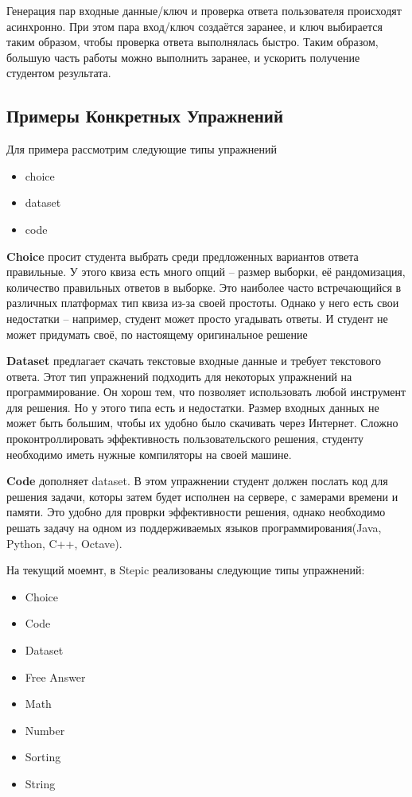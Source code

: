 \documentclass{matmex-diploma-custom}
\begin{document}
Генерация пар входные данные/ключ и проверка ответа пользователя
происходят асинхронно. При этом пара вход/ключ создаётся заранее, и
ключ выбирается таким образом, чтобы проверка ответа выполнялась
быстро. Таким образом, большую часть работы можно выполнить заранее,
и ускорить получение студентом результата.

\subsection*{Примеры Конкретных Упражнений}
Для примера рассмотрим следующие типы упражнений
\begin{itemize}
\item choice
\item dataset
\item code
\end{itemize}

\textbf{Choice} просит студента выбрать среди предложенных вариантов
ответа правильные. У этого квиза есть много опций -- размер выборки,
её рандомизация, количество правильных ответов в выборке. Это наиболее
часто встречающийся в различных платформах тип квиза из-за своей
простоты. Однако у него есть свои недостатки -- например, студент
может просто угадывать ответы. И студент не может придумать своё, по
настоящему оригинальное решение

\textbf{Dataset} предлагает скачать текстовые входные данные и требует
текстового ответа. Этот тип упражнений подходить для некоторых
упражнений на программирование. Он хорош тем, что позволяет
использовать любой инструмент для решения. Но у этого типа есть и
недостатки. Размер входных данных не может быть большим, чтобы их
удобно было скачивать через Интернет. Сложно проконтроллировать
эффективность пользовательского решения, студенту необходимо иметь
нужные компиляторы на своей машине.

\textbf{Code} дополняет dataset. В этом упражнении студент должен
послать код для решения задачи, которы затем будет исполнен на
сервере, с замерами времени и памяти. Это удобно для проврки
эффективности решения, однако необходимо решать задачу на одном из
поддерживаемых языков программирования(Java, Python, C++, Octave).

На текущий моемнт, в Stepic реализованы следующие типы упражнений:
\begin{itemize}
\item Choice
\item Code
\item Dataset
\item Free Answer
\item Math
\item Number
\item Sorting
\item String
\end{itemize}
\end{document}
